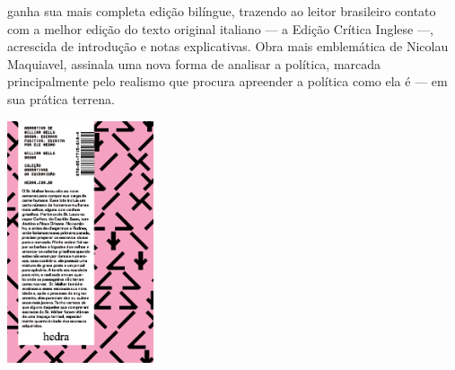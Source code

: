 \hspace*{-7cm}\hrulefill\hspace*{-7cm}

\medskip

 ganha sua mais completa edição bilíngue, trazendo ao leitor brasileiro contato com a melhor edição do texto original italiano --- a Edição Crítica Inglese ---, acrescida de introdução e notas explicativas. Obra mais emblemática de Nicolau Maquiavel, {} assinala uma nova forma de analisar a política, marcada principalmente pelo realismo que procura apreender a política como ela é --- em sua prática terrena.

\vfill

\hspace*{-.4cm}\begin{minipage}[c]{1\linewidth}
\small{
{}}
\end{minipage}

\pagebreak

\hspace{.5cm}

\begin{center}
\hspace*{-2.7cm}
\hspace*{2cm}\includegraphics[width=43mm]{./imgs/wwb.png}
\end{center}

